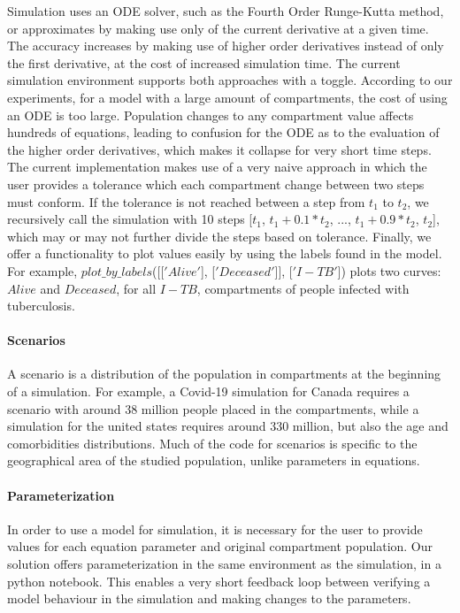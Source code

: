 Simulation uses an ODE solver, such as the Fourth Order Runge-Kutta method, or approximates by making use only of the current derivative at a given time. The accuracy increases by making use of higher order derivatives instead of only the first derivative, at the cost of increased simulation time. The current simulation environment supports both approaches with a toggle. According to our experiments, for a model with a large amount of compartments, the cost of using an ODE is too large. Population changes to any compartment value affects hundreds of equations, leading to confusion for the ODE as to the evaluation of the higher order derivatives, which makes it collapse for very short time steps. The current implementation makes use of a very naive approach in which the user provides a tolerance which each compartment change between two steps must conform. If the tolerance is not reached between a step from $t_1$ to $t_2$, we recursively call the simulation with 10 steps [$t_1$, $t_1 + 0.1 * t_2$, ...,  $t_1 + 0.9 * t_2$, $t_2$], which may or may not further divide the steps based on tolerance. Finally, we offer a functionality to plot values easily by using the labels found in the model. For example, $plot\_by\_labels$([[$'Alive'$], [$'Deceased'$]], [$'I-TB'$]) plots two curves: $Alive$ and $Deceased$, for all $I-TB$, compartments of people infected with tuberculosis.

\paragraph{Scenarios}
A scenario is a distribution of the population in compartments at the beginning of a simulation.
For example, a Covid-19 simulation for Canada requires a scenario with around 38 million people placed in the compartments, while a simulation for the united states requires around 330 million, but also the age and comorbidities distributions.
Much of the code for scenarios is specific to the geographical area of the studied population, unlike parameters in equations.

\paragraph{Parameterization}

In order to use a model for simulation, it is necessary for the user to provide values for each equation parameter and original compartment population. Our solution offers parameterization in the same environment as the simulation, in a python notebook. This enables a very short feedback loop between verifying a model behaviour in the simulation and making changes to the parameters.

